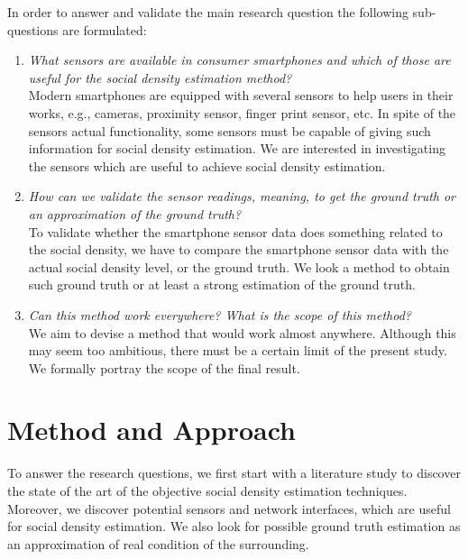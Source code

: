 In order to answer and validate the main research question the following sub-questions are formulated:
\begin{enumerate}
	\item \textit{What sensors are available in consumer smartphones and which of those are useful for the social density estimation method?}\\
	Modern smartphones are equipped with several sensors to help users in their works, e.g., cameras, proximity sensor, finger print sensor, etc. In spite of the sensors actual functionality, some sensors must be capable of giving such information for social density estimation. We are interested in investigating the sensors which are useful to achieve social density estimation.

	\item \textit{How can we validate the sensor readings, meaning, to get the ground truth or an approximation of the ground truth?}\\
	To validate whether the smartphone sensor data does something related to the social density, we have to compare the smartphone sensor data with the actual social density level, or the ground truth. We look a method to obtain such ground truth or at least a strong estimation of the ground truth.


	\item \textit{Can this method work everywhere? What is the scope of this method?}\\
	We aim to devise a method that would work almost anywhere. Although this may seem too ambitious, there must be a certain limit of the present study. We formally portray the scope of the final result.
\end{enumerate}


	\section{Method and Approach} %
	\label{sec:method_and_approach}
	To answer the research questions, we first start with a literature study to discover the state of the art of the objective social density estimation techniques. Moreover, we discover potential sensors and network interfaces, which are useful for social density estimation. We also look for possible ground truth estimation as an approximation of real condition of the surrounding.

